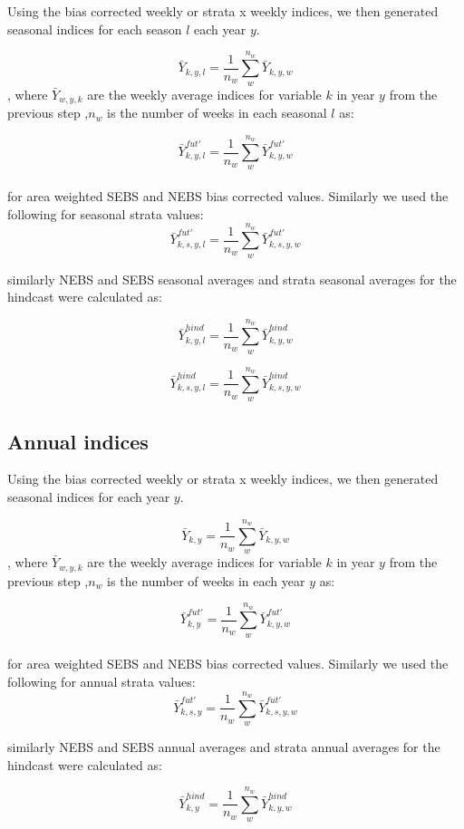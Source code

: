 \documentclass[
]{article}
\begin{document}
Using the bias corrected weekly or strata x weekly indices, we then
generated seasonal indices for each season \(l\) each year \(y\).

\[\bar{Y}_{k,y,l}= \frac{1}{n_w}\sum^{n_w}_{w}\bar{Y}_{k,y,w}\], where
\(\bar{Y}_{w,y,k}\) are the weekly average indices for variable \(k\) in
year \(y\) from the previous step ,\(n_w\) is the number of weeks in
each seasonal \(l\) as:

\[\bar{Y}^{fut'}_{k,y,l} = \frac{1}{n_w}\sum^{n_w}_{w}\bar{Y}^{fut'}_{k,y,w}\]\\
for area weighted SEBS and NEBS bias corrected values. Similarly we used
the following for seasonal strata values:\\
\[\bar{Y}^{fut'}_{k,s,y,l} = \frac{1}{n_w}\sum^{n_w}_{w}\bar{Y}^{fut'}_{k,s,y,w}\]

similarly NEBS and SEBS seasonal averages and strata seasonal averages
for the hindcast were calculated as:

\[\bar{Y}^{hind}_{k,y,l} = \frac{1}{n_w}\sum^{n_w}_{w}\bar{Y}^{hind}_{k,y,w}\]

\[\bar{Y}^{hind}_{k,s,y,l} = \frac{1}{n_w}\sum^{n_w}_{w}\bar{Y}^{hind}_{k,s,y,w}\]

\hypertarget{annual-indices}{%
\subsection{Annual indices}\label{annual-indices}}

Using the bias corrected weekly or strata x weekly indices, we then
generated seasonal indices for each year \(y\).

\[\bar{Y}_{k,y}= \frac{1}{n_w}\sum^{n_w}_{w}\bar{Y}_{k,y,w}\], where
\(\bar{Y}_{w,y,k}\) are the weekly average indices for variable \(k\) in
year \(y\) from the previous step ,\(n_w\) is the number of weeks in
each year \(y\) as:

\[\bar{Y}^{fut'}_{k,y} = \frac{1}{n_w}\sum^{n_w}_{w}\bar{Y}^{fut'}_{k,y,w}\]\\
for area weighted SEBS and NEBS bias corrected values. Similarly we used
the following for annual strata values:\\
\[\bar{Y}^{fut'}_{k,s,y} = \frac{1}{n_w}\sum^{n_w}_{w}\bar{Y}^{fut'}_{k,s,y,w}\]

similarly NEBS and SEBS annual averages and strata annual averages for
the hindcast were calculated as:

\[\bar{Y}^{hind}_{k,y} = \frac{1}{n_w}\sum^{n_w}_{w}\bar{Y}^{hind}_{k,y,w}\]
\end{document}
